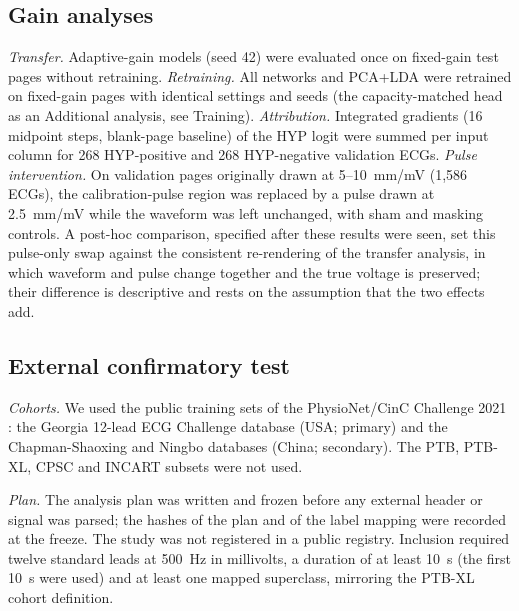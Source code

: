 \documentclass{wlscirep}
\begin{document}
\subsection*{Gain analyses}
\emph{Transfer.} Adaptive-gain models (seed 42) were evaluated once on fixed-gain test pages without retraining. \emph{Retraining.} All networks and PCA+LDA were retrained on fixed-gain pages with identical settings and seeds (the capacity-matched head as an Additional analysis, see Training). \emph{Attribution.} Integrated gradients \cite{sundararajan2017ig} (16 midpoint steps, blank-page baseline) of the HYP logit were summed per input column for 268 HYP-positive and 268 HYP-negative validation ECGs. \emph{Pulse intervention.} On validation pages originally drawn at 5--10~mm/mV (1{,}586 ECGs), the calibration-pulse region was replaced by a pulse drawn at 2.5~mm/mV while the waveform was left unchanged, with sham and masking controls. A post-hoc comparison, specified after these results were seen, set this pulse-only swap against the consistent re-rendering of the transfer analysis, in which waveform and pulse change together and the true voltage is preserved; their difference is descriptive and rests on the assumption that the two effects add.

\subsection*{External confirmatory test}
\emph{Cohorts.} We used the public training sets of the PhysioNet/CinC Challenge 2021 \cite{reyna2021challenge,reyna2022challengedata}: the Georgia 12-lead ECG Challenge database (USA; primary) and the Chapman-Shaoxing \cite{zheng2020chapman} and Ningbo \cite{zheng2022ningbo} databases (China; secondary). The PTB, PTB-XL, CPSC and INCART subsets were not used.

\emph{Plan.} The analysis plan was written and frozen before any external header or signal was parsed; the hashes of the plan and of the label mapping were recorded at the freeze. The study was not registered in a public registry. Inclusion required twelve standard leads at 500~Hz in millivolts, a duration of at least 10~s (the first 10~s were used) and at least one mapped superclass, mirroring the PTB-XL cohort definition.
\end{document}
